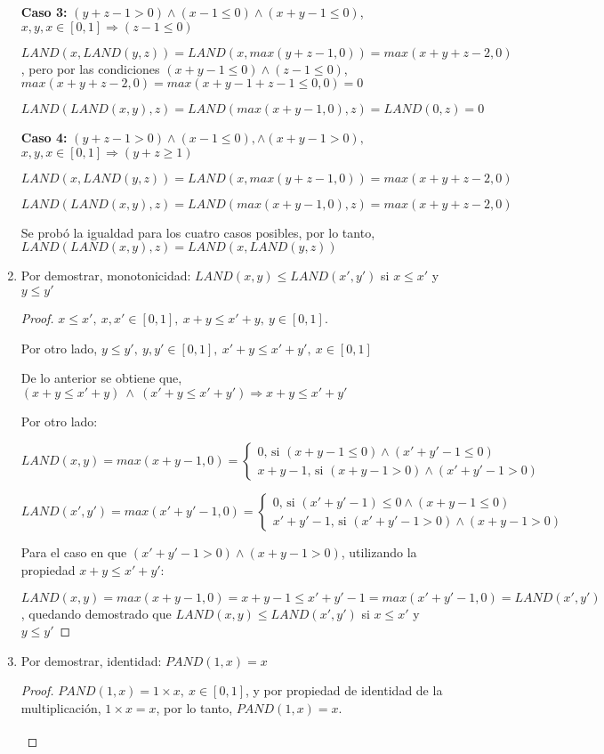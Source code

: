 \documentclass[letterpaper,spanish,11pt]{article}
\begin{document}
\begin{enumerate}
\textbf{Caso 3:} $(y+z-1 > 0) \wedge (x-1 \leq 0)  \wedge (x+y-1 \leq 0)$, $x,y,x \in [0,1] \Rightarrow (z - 1 \leq 0) $

$LAND(x,LAND(y,z))=LAND(x,max(y+z-1,0))=max(x +y +z-2 ,0)$, pero por las condiciones $(x+y-1 \leq 0) \wedge (z-1 \leq 0)$, $max(x+y+z-2,0)=max(x+y-1+z-1 \leq 0, 0) = 0$


$LAND(LAND(x,y),z)=LAND(max(x+y-1,0),z) = LAND(0,z)=0$

\textbf{Caso 4:} $(y+z-1 > 0) \wedge (x-1 \leq 0), \wedge (x+y-1 > 0),$  $x,y,x \in [0,1] \Rightarrow (y+z \geq 1)$

$LAND(x,LAND(y,z))=LAND(x,max(y+z-1,0))=max(x +y +z-2 ,0)$

$LAND(LAND(x,y),z)=LAND(max(x+y-1,0),z)=max(x+y+z-2,0)$

Se prob\'{o} la igualdad para los cuatro casos posibles, por lo tanto, $LAND(LAND(x,y),z)=LAND(x,LAND(y,z))$

\item Por demostrar, monotonicidad: $LAND(x,y) \leq LAND(x',y')$ si $x\leq x'$ y $y\leq y'$

\begin{proof}
$x \leq x', \ x,x' \in [0,1], \ x+y \leq  x'+y, \ y \in [0,1]$.

Por otro lado, $y \leq y', \  y,y' \in [0,1], \  x'+y \leq x'+y', \ x \in [0,1] $

De lo anterior se obtiene que, $(x + y \leq  x'+y) \ \wedge \  (x'+y \leq x'+y') \Rightarrow x + y \leq x'+y'$

Por otro lado:

$LAND(x,y)=max(x+y-1,0)= \begin{cases} 0  \text{, si } (x+y-1 \leq 0 ) \wedge (x'+y'-1 \leq 0)\\ 
x+y-1  \text{,  si } (x+y-1 > 0) \wedge (x'+y'-1 > 0) \end{cases}$

$LAND(x',y')=max(x'+y'-1,0)=\begin{cases} 0 \text{,   si } (x'+y'-1) \leq 0 \wedge (x+y-1 \leq 0 )  \\ x'+y'-1 \text{,   si } (x'+y'-1 > 0) \wedge (x+y-1 > 0 ) \end{cases}$

Para el caso en que $(x'+y'-1 > 0) \wedge (x+y-1 > 0 )$, utilizando la propiedad $x + y \leq x'+y'$:

$LAND(x,y)=max(x+y-1,0) = x+y-1  \leq x'+y'-1 = max(x'+y'-1,0)=LAND(x',y')$, quedando demostrado que $LAND(x,y) \leq LAND(x',y')$ si $x\leq x'$ y $y\leq y'$
\end{proof}

\item Por demostrar, identidad: $PAND(1,x)=x$

\begin{proof}
$PAND(1,x)=1\times x, \ x \in [0,1]$, y por propiedad de identidad de la multiplicaci\'{o}n, $1\times x=x$, por lo tanto, $PAND(1,x)=x$.
\[\qedhere\]
\end{proof}


\end{enumerate}
\end{document}
